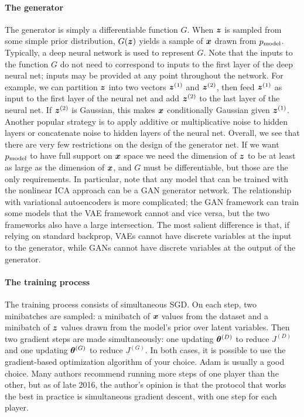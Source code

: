 \paragraph{The generator}
The generator is simply a differentiable function $G$.
When ${\bm{z}}$ is sampled from some simple prior distribution,
$G({\bm{z}})$ yields a sample of ${\bm{x}}$ drawn from $p_{\rm{model}}$.
Typically, a deep neural network is used to represent $G$.
Note that the inputs to the function $G$ do not need to correspond
to inputs to the first layer of the deep neural net; inputs may
be provided at any point throughout the network.
For example, we can partition ${\bm{z}}$ into two vectors ${\bm{z}}^{(1)}$
and ${\bm{z}}^{(2)}$, then feed ${\bm{z}}^{(1)}$ as input to the first layer
of the neural net and add ${\bm{z}}^{(2)}$ to the last layer of the neural
net. If ${\bm{z}}^{(2)}$ is Gaussian, this makes ${\bm{x}}$ conditionally Gaussian
given ${\bm{z}}^{(1)}$.
Another popular strategy is to apply additive or multiplicative noise to
hidden layers or concatenate noise to hidden layers of the neural net.
Overall, we see that there are very few restrictions on the design of
the generator net.
If we want $p_{\rm{model}}$ to have full support on ${\bm{x}}$ space we need the dimension
of ${\bm{z}}$ to be at least as large as the dimension of ${\bm{x}}$, and $G$ must be
differentiable, but those are the only requirements.
In particular, note that any model that can be trained with the nonlinear
ICA approach can be a GAN generator network.
The relationship with variational autoencoders is more complicated;
the GAN framework can train some models that the VAE framework cannot and vice
versa, but the two frameworks also have a large intersection.
The most salient difference is that, if relying on standard backprop,
VAEs cannot have discrete variables at the input to the generator,
while GANs cannot have discrete variables at the output of the generator.

\paragraph{The training process}
The training process consists of simultaneous SGD.
On each step, two minibatches are sampled: a minibatch of ${\bm{x}}$ values from
the dataset and a minibatch of ${\bm{z}}$ values drawn from the model's prior over
latent variables.
Then two gradient steps are made simultaneously:
one updating ${\bm{\theta}}^{(D)}$ to reduce $J^{(D)}$
and one updating ${\bm{\theta}}^{(G)}$ to reduce $J^{(G)}$.
In both cases, it is possible to use the gradient-based optimization algorithm
of your choice.
Adam \citep{kingma2014adam} is usually a good choice.
Many authors recommend running more steps of one player than the other, but
as of late 2016, the author's opinion is that the protocol that works the best
in practice is simultaneous gradient descent, with one step for each player.


